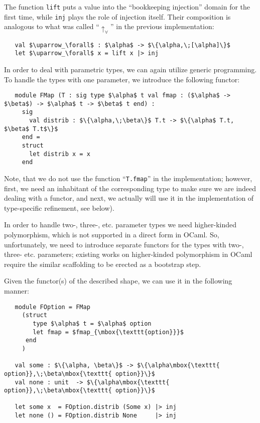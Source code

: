 The function \lstinline{lift} puts a value into the ``bookkeeping injection'' domain for the first time, while
\lstinline{inj} plays the role of injection itself. Their composition is analogous to what was
called ``$\uparrow_\forall$'' in the previous implementation:

\begin{lstlisting}
   val $\uparrow_\forall$ : $\alpha$ -> $\{\alpha,\;[\alpha]\}$
   let $\uparrow_\forall$ x = lift x |> inj
\end{lstlisting}

In order to deal with parametric types, we can again utilize generic programming. To handle the types with
one parameter, we introduce the following functor:

\begin{lstlisting}
   module FMap (T : sig type $\alpha$ t val fmap : ($\alpha$ -> $\beta$) -> $\alpha$ t -> $\beta$ t end) :
     sig
       val distrib : $\{\alpha,\;\beta\}$ T.t -> $\{\alpha$ T.t, $\beta$ T.t$\}$
     end =
     struct
       let distrib x = x
     end
\end{lstlisting}

Note, that we do not use the function ``\lstinline{T.fmap}'' in the implementation; however, first, we need an inhabitant of the
corresponding type to make sure we are indeed dealing with a functor, and next, we actually will use it in the
implementation of type-specific refinement, see below).

In order to handle two-, three-, etc. parameter types we need higher-kinded polymorphism, which is
not supported in a direct form in OCaml. So, unfortunately, we need to introduce separate
functors for the types with two-, three- etc. parameters; existing works on higher-kinded
polymorphism in OCaml~\cite{HKinded} require the similar scaffolding to be erected as a bootstrap step.

Given the functor(s) of the described shape, we can use it in the following manner:

\begin{lstlisting}
   module FOption = FMap
     (struct
        type $\alpha$ t = $\alpha$ option
        let fmap = $fmap_{\mbox{\texttt{option}}}$
      end
     )

   val some : $\{\alpha, \beta\}$ -> $\{\alpha\mbox{\texttt{ option}},\;\beta\mbox{\texttt{ option}}\}$
   val none : unit  -> $\{\alpha\mbox{\texttt{ option}},\;\beta\mbox{\texttt{ option}}\}$

   let some x  = FOption.distrib (Some x) |> inj
   let none () = FOption.distrib None     |> inj
\end{lstlisting}

